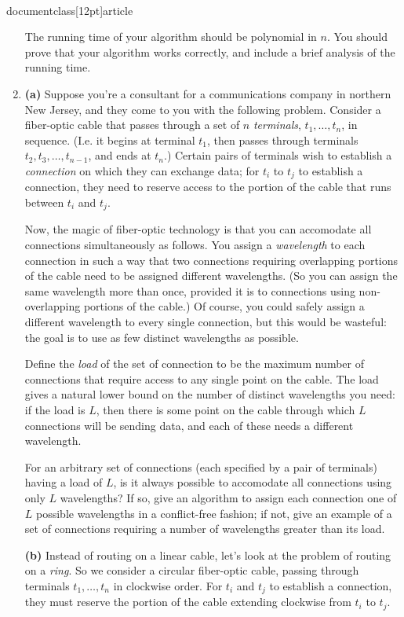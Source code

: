 \\documentclass[12pt]{article}
\def\gap{0.2in}
\begin{document}
\begin{enumerate}
The running time of your algorithm should be polynomial in $n$.
You should prove that your algorithm works correctly, and include a
brief analysis of the running time.




\item 

{\bf (a)}
Suppose you're a consultant for a communications
company in northern New Jersey, and they come to
you with the following problem.
Consider a fiber-optic cable that passes through
a set of $n$ {\em terminals}, $t_1, \ldots, t_n$, in sequence.
(I.e. it begins at terminal $t_1$, then passes through
terminals $t_2, t_3, \ldots, t_{n-1}$, and ends at $t_n$.)
Certain pairs of terminals wish to establish a
{\em connection} on which they can exchange data;
for $t_i$ to $t_j$ to establish a connection,
they need to reserve access to the portion of
the cable that runs between $t_i$ and $t_j$.

Now, the magic of fiber-optic technology is that you can
accomodate all connections simultaneously as follows.
You assign a {\em wavelength} to each connection
in such a way that two connections requiring overlapping
portions of the cable need to be assigned different wavelengths.
(So you can assign the same wavelength more than once, provided it
is to connections using non-overlapping portions of the cable.)
Of course, you could safely assign a different wavelength
to every single connection, but this would be wasteful:
the goal is to use as few distinct wavelengths as possible.

Define the {\em load} of the set of connection to be
the maximum number of connections that require access
to any single point on the cable.
The load gives a natural lower bound on the number of
distinct wavelengths you need: if the load is $L$,
then there is some point on the cable through which
$L$ connections will be sending data, and each of
these needs a different wavelength.

For an arbitrary set of connections (each specified by
a pair of terminals) having a load of $L$,
is it always possible to accomodate all connections
using only $L$ wavelengths?
If so, give an algorithm to assign each connection
one of $L$ possible wavelengths in a conflict-free fashion;
if not, give an example of a set of connections
requiring a number of wavelengths greater than its load.

\vskip \gap
{\bf (b)} Instead of routing on a linear cable,
let's look at the problem of routing on a {\em ring}.
So we consider a circular fiber-optic cable, passing through
terminals $t_1, \ldots, t_n$ in clockwise order.
For $t_i$ and $t_j$ to establish a connection, they must
reserve the portion of the cable extending clockwise
from $t_i$ to $t_j$.


\end{enumerate}
\end{document}
